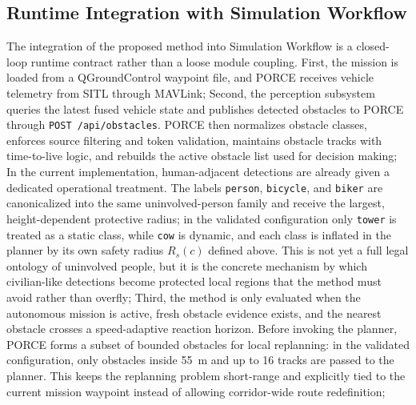 \documentclass[journal,twoside,web]{ieeecolor}
\begin{document}
\subsection{Runtime Integration with Simulation Workflow}
The integration of the proposed method into Simulation Workflow is a closed-loop runtime contract rather than a loose module coupling. 
\newline
First, the mission is loaded from a QGroundControl waypoint file, and PORCE receives vehicle telemetry from SITL through MAVLink;
\newline 
Second, the perception subsystem queries the latest fused vehicle state and publishes detected obstacles to PORCE through \texttt{POST /api/obstacles}. PORCE then normalizes obstacle classes, enforces source filtering and token validation, maintains obstacle tracks with time-to-live logic, and rebuilds the active obstacle list used for decision making;
\newline
In the current implementation, human-adjacent detections are already given a dedicated operational treatment. The labels \texttt{person}, \texttt{bicycle}, and \texttt{biker} are canonicalized into the same uninvolved-person family and receive the largest, height-dependent protective radius; in the validated configuration only \texttt{tower} is treated as a static class, while \texttt{cow} is dynamic, and each class is inflated in the planner by its own safety radius \(R_s(c)\) defined above. This is not yet a full legal ontology of uninvolved people, but it is the concrete mechanism by which civilian-like detections become protected local regions that the method must avoid rather than overfly;
\newline
Third, the method is only evaluated when the autonomous mission is active, fresh obstacle evidence exists, and the nearest obstacle crosses a speed-adaptive reaction horizon. Before invoking the planner, PORCE forms a subset of bounded obstacles for local replanning: in the validated configuration, only obstacles inside \SI{55}{\meter} and up to 16 tracks are passed to the planner. This keeps the replanning problem short-range and explicitly tied to the current mission waypoint instead of allowing corridor-wide route redefinition; 
\end{document}
